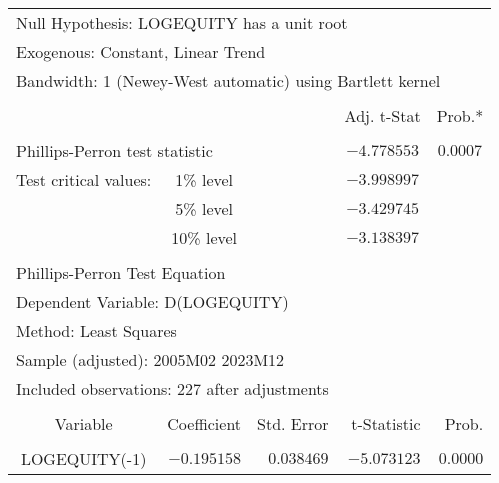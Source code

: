 \begin{tabular}{lrrrr}
\multicolumn{4}{l}{Null Hypothesis: LOGEQUITY has a unit root}&\multicolumn{1}{c}{}\\
\multicolumn{3}{l}{Exogenous: Constant, Linear Trend}&\multicolumn{1}{c}{}&\multicolumn{1}{c}{}\\
\multicolumn{5}{l}{Bandwidth: 1 (Newey-West automatic) using Bartlett kernel}\\
[4.5pt] \hline \\ [-4.5pt]
\multicolumn{1}{c}{}&\multicolumn{1}{c}{}&\multicolumn{1}{c}{}&\multicolumn{1}{c}{Adj. t-Stat}&\multicolumn{1}{c}{Prob.*}\\
[4.5pt] \hline \\ [-4.5pt]
\multicolumn{2}{l}{Phillips-Perron test statistic}&\multicolumn{1}{l}{}&\multicolumn{1}{c}{$-4.778553$}&\multicolumn{1}{c}{$0.0007$}\\
\multicolumn{1}{l}{Test critical values:}&\multicolumn{1}{c}{1\% level}&\multicolumn{1}{c}{}&\multicolumn{1}{c}{$-3.998997$}&\multicolumn{1}{c}{}\\
\multicolumn{1}{c}{}&\multicolumn{1}{c}{5\% level}&\multicolumn{1}{c}{}&\multicolumn{1}{c}{$-3.429745$}&\multicolumn{1}{c}{}\\
\multicolumn{1}{c}{}&\multicolumn{1}{c}{10\% level}&\multicolumn{1}{c}{}&\multicolumn{1}{c}{$-3.138397$}&\multicolumn{1}{c}{}\\
[4.5pt] \hline \\ [-4.5pt]
\multicolumn{2}{l}{Phillips-Perron Test Equation}&\multicolumn{1}{c}{}&\multicolumn{1}{c}{}&\multicolumn{1}{c}{}\\
\multicolumn{3}{l}{Dependent Variable: D(LOGEQUITY)}&\multicolumn{1}{c}{}&\multicolumn{1}{c}{}\\
\multicolumn{2}{l}{Method: Least Squares}&\multicolumn{1}{c}{}&\multicolumn{1}{c}{}&\multicolumn{1}{c}{}\\
\multicolumn{3}{l}{Sample (adjusted): 2005M02 2023M12}&\multicolumn{1}{c}{}&\multicolumn{1}{c}{}\\
\multicolumn{4}{l}{Included observations: 227 after adjustments}&\multicolumn{1}{c}{}\\
[4.5pt] \hline \\ [-4.5pt]
\multicolumn{1}{c}{Variable}&\multicolumn{1}{r}{Coefficient}&\multicolumn{1}{r}{Std. Error}&\multicolumn{1}{r}{t-Statistic}&\multicolumn{1}{r}{Prob.}\\
[4.5pt] \hline \\ [-4.5pt]
\multicolumn{1}{c}{LOGEQUITY(-1)}&\multicolumn{1}{r}{$-0.195158$}&\multicolumn{1}{r}{$0.038469$}&\multicolumn{1}{r}{$-5.073123$}&\multicolumn{1}{r}{$0.0000$}\\

\end{tabular}
